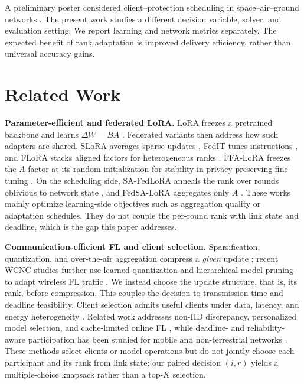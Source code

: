 \documentclass[conference]{IEEEtran}
\begin{document}
A preliminary poster considered client--protection scheduling in space--air--ground networks \cite{ma2026mswim}. The present work studies a different decision variable, solver, and evaluation setting. We report learning and network metrics separately. The expected benefit of rank adaptation is improved delivery efficiency, rather than universal accuracy gains.

\section{Related Work}
\label{sec:related}

\textbf{Parameter-efficient and federated LoRA.} LoRA freezes a pretrained backbone and learns $\Delta W = BA$ \cite{hu2022lora}. Federated variants then address how such adapters are shared. SLoRA averages sparse updates \cite{babakniya2023slora}, FedIT tunes instructions \cite{zhang2024fedit}, and FLoRA stacks aligned factors for heterogeneous ranks \cite{wang2024flora}. FFA-LoRA freezes the $A$ factor at its random initialization for stability in privacy-preserving fine-tuning \cite{sun2024ffalora}. On the scheduling side, SA-FedLoRA anneals the rank over rounds oblivious to network state \cite{yang2024safedlora}, and FedSA-LoRA aggregates only $A$ \cite{guo2025fedsalora}. These works mainly optimize learning-side objectives such as aggregation quality or adaptation schedules. They do not couple the per-round rank with link state and deadline, which is the gap this paper addresses.

\textbf{Communication-efficient FL and client selection.} Sparsification, quantization, and over-the-air aggregation compress a \emph{given} update \cite{oh2023fedqcs}; recent WCNC studies further use learned quantization and hierarchical model pruning to adapt wireless FL traffic \cite{zheng2023wcncquant,liu2024wcncpruning}. We instead choose the update structure, that is, its rank, before compression. This couples the decision to transmission time and deadline feasibility. Client selection admits useful clients under data, latency, and energy heterogeneity \cite{oort2021oort}. Related work addresses non-IID discrepancy, personalized model selection, and cache-limited online FL \cite{shen2023wcncnoniid,chen2024wcncmodel,hu2025wcnconline}, while deadline- and reliability-aware participation has been studied for mobile and non-terrestrial networks \cite{tang2023flsagin,qin2024dfrl,ribero2023intermittent}. These methods select clients or model operations but do not jointly choose each participant and its rank from link state; our paired decision $(i,r)$ yields a multiple-choice knapsack rather than a top-$K$ selection.
\end{document}
